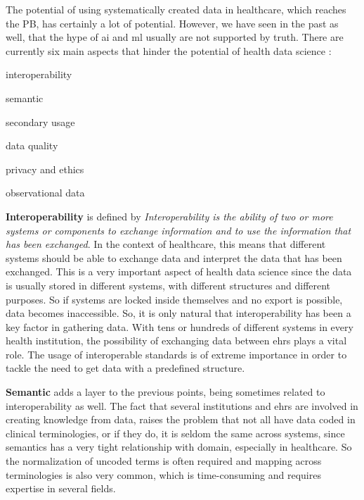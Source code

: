 The potential of using systematically created data in healthcare, which reaches the PB, has certainly a lot of potential. However, we have seen in the past as well, that the hype of \ac{ai} and \ac{ml} usually are not supported by truth. There are currently six main aspects that hinder the potential of health data science \cite{panchInconvenientTruthAI2019,peekThreeControversiesHealth2018}:
\begin{myitemize}
    \item interoperability
    \item semantic
    \item secondary usage
    \item data quality
    \item privacy and ethics
    \item observational data
\end{myitemize}

\textbf{Interoperability} is defined by \textit{Interoperability is the ability of two or more systems or components to exchange information and to use the information that has been exchanged}\cite{182763}. In the context of healthcare, this means that different systems should be able to exchange data and interpret the data that has been exchanged. This is a very important aspect of health data science since the data is usually stored in different systems, with different structures and different purposes. So if systems are locked inside themselves and no export is possible, data becomes inaccessible. So, it is only natural that interoperability has been a key factor in gathering data. With tens or hundreds of different systems in every health institution, the possibility of exchanging data between \acp{ehr} plays a vital role. The usage of interoperable standards is of extreme importance in order to tackle the need to get data with a predefined structure.


\textbf{Semantic} adds a layer to the previous points, being sometimes related to interoperability as well. The fact that several institutions and \acp{ehr} are involved in creating knowledge from data, raises the problem that not all have data coded in clinical terminologies, or if they do, it is seldom the same across systems, since semantics has a very tight relationship with domain, especially in healthcare. So the normalization of uncoded terms is often required and mapping across terminologies is also very common, which is time-consuming and requires expertise in several fields.




